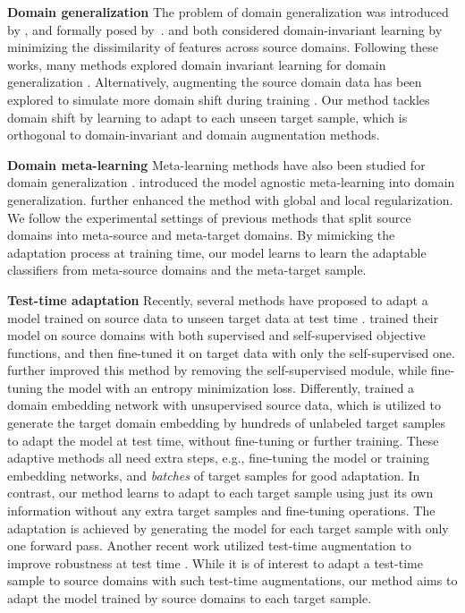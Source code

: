 \documentclass{article} \usepackage[table]{xcolor}
\begin{document}
\textbf{Domain generalization} The problem of domain generalization was introduced by \cite{blanchard2011generalizing}, and formally posed by~\cite{muandet2013domain}.  \cite{muandet2013domain} and  \cite{ghifary2016scatter} both considered domain-invariant learning by minimizing the dissimilarity of features across source domains. Following these works, many methods explored domain invariant learning for domain generalization \citep{motiian2017unified,rojas2018invariant,li2018domainb,seo2020learning,zhao2020domain}. 
Alternatively, augmenting the source domain data has been explored to simulate more domain shift during training \citep{shankar2018generalizing,volpi2018generalizing,zhou2020learning,qiao2020learning,zhou2021mix}. 
Our method tackles domain shift by learning to adapt to each unseen target sample, which is orthogonal to domain-invariant and domain augmentation methods.

\textbf{Domain meta-learning} Meta-learning methods have also been studied for domain generalization \citep{balaji2018metareg,du2020learning,xiao2021bit, du2020metanorm}. \cite{li2018metalearning} introduced the model agnostic meta-learning \citep{finn2017model} into domain generalization. \cite{dou2019domain} further enhanced the method with global and local regularization. 
We follow the experimental settings of previous methods \citep{du2020learning,xiao2021bit} that split source domains into meta-source and meta-target domains. By mimicking the adaptation process at training time, our model learns to learn the adaptable classifiers from meta-source domains and the meta-target sample.


\textbf{Test-time adaptation} Recently, several methods have proposed to adapt a model trained on source data to unseen target data at test time \citep{d2019learning,sun2020test,wang2021tent,dubey2021adaptive}.  \cite{sun2020test} trained their model on source domains with both supervised and self-supervised objective functions, and then fine-tuned it on target data with only the self-supervised one.
\cite{wang2021tent} further improved this method by removing the self-supervised module, while fine-tuning the model with an entropy minimization loss.
Differently,  \cite{dubey2021adaptive} trained a domain embedding network with unsupervised source data, 
which is utilized to generate the target domain embedding by hundreds of unlabeled target samples
to adapt the model at test time, without fine-tuning or further training. 
These adaptive methods all need extra steps, e.g., fine-tuning the model or training embedding networks, and \textit{batches} of target samples for good adaptation. 
In contrast, our method learns to adapt to each target sample using just its own information without any extra target samples and fine-tuning operations.
The adaptation is achieved by generating the model for each target sample with only one forward pass.
Another recent work utilized test-time augmentation to improve robustness at test time  \citep{chai2021ensembling}. 
While it is of interest to adapt a test-time sample to source domains with such test-time augmentations, our method aims to adapt the model trained by source domains to each target sample.
\end{document}
